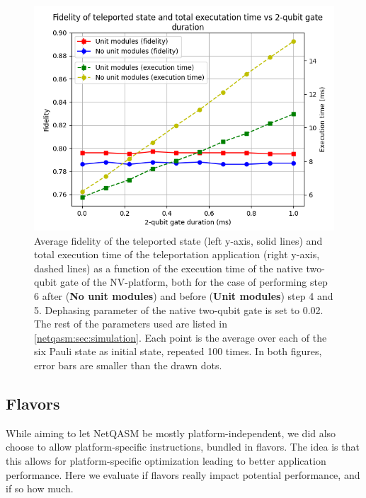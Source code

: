 \begin{figure}[t]
    \centering
    \includegraphics[scale=0.8]{figures/netqasm/plots/paper_teleport_sweep_gate_time.png}
    \caption{
        Average fidelity of the teleported state (left y-axis, solid lines) and total
        execution time of the teleportation application (right y-axis, dashed
        lines) as a function of the execution time of the native two-qubit gate
        of the NV-platform, both for the case of performing step 6 after
        (\textbf{No unit modules}) and before (\textbf{Unit modules}) step 4 and
        5. Dephasing parameter of the native two-qubit gate is set to 0.02. The
        rest of the parameters used are listed in \cref{netqasm:sec:simulation}. Each
        point is the average over each of the six Pauli state as initial state,
        repeated 100 times. In both figures, error bars are smaller than the drawn
        dots.}
  \label{netqasm:fig:sweep_gate_time}
\end{figure}



\subsection{Flavors}
\label{design_decisions_flavors}
While aiming to let \ac{NetQASM} be mostly platform-independent, we did also choose to allow platform-specific instructions, bundled in flavors.
The idea is that this allows for platform-specific optimization leading to better application performance.
Here we evaluate if flavors really impact potential performance, and if so how much.

